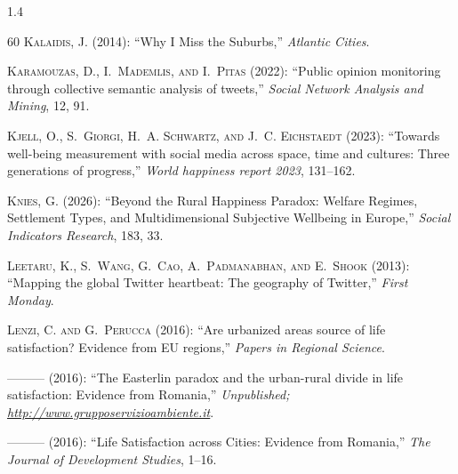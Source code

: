 \documentclass[10pt, letterpaper]{article}
\begin{document}
\begin{spacing}{1.4}
\begin{thebibliography}{60}
\textsc{Kalaidis, J.} (2014): \enquote{Why I Miss the Suburbs,} \emph{Atlantic
  Cities}.

\textsc{Karamouzas, D., I.~Mademlis, and I.~Pitas} (2022): \enquote{Public
  opinion monitoring through collective semantic analysis of tweets,}
  \emph{Social Network Analysis and Mining}, 12, 91.

\textsc{Kjell, O., S.~Giorgi, H.~A. Schwartz, and J.~C. Eichstaedt} (2023):
  \enquote{Towards well-being measurement with social media across space, time
  and cultures: Three generations of progress,} \emph{World happiness report
  2023}, 131--162.

\textsc{Knies, G.} (2026): \enquote{Beyond the Rural Happiness Paradox: Welfare
  Regimes, Settlement Types, and Multidimensional Subjective Wellbeing in
  Europe,} \emph{Social Indicators Research}, 183, 33.

\textsc{Leetaru, K., S.~Wang, G.~Cao, A.~Padmanabhan, and E.~Shook} (2013):
  \enquote{Mapping the global Twitter heartbeat: The geography of Twitter,}
  \emph{First Monday}.

\textsc{Lenzi, C. and G.~Perucca} (2016{}): \enquote{Are urbanized
  areas source of life satisfaction? Evidence from EU regions,} \emph{Papers in
  Regional Science}.

---\hspace{-.1pt}---\hspace{-.1pt}--- (2016{}): \enquote{The
  Easterlin paradox and the urban-rural divide in life satisfaction: Evidence
  from Romania,} \emph{Unpublished;
  \url{http://www.grupposervizioambiente.it}}.

---\hspace{-.1pt}---\hspace{-.1pt}--- (2016{}): \enquote{Life
  Satisfaction across Cities: Evidence from Romania,} \emph{The Journal of
  Development Studies}, 1--16.


\end{thebibliography}
\end{spacing}
\end{document}
